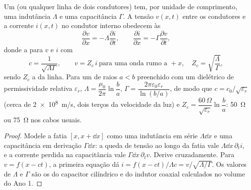 \begin{proposition}\label{prop:b2:dispersion-wave-packets:coax}
Um  (ou qualquer linha de dois condutores) tem, por unidade de comprimento, uma
indutância $\Lambda$ e uma capacitância $\Gamma$. A tensão $v(x, t)$ entre
os condutores e a corrente $i(x, t)$ no condutor interno obedecem às
\emph{}
\[
\frac{\partial v}{\partial x} = -\Lambda\frac{\partial i}{\partial t} , \qquad
\frac{\partial i}{\partial x} = -\Gamma\frac{\partial v}{\partial t} ,
\]
donde a  para $v$ e $i$ com
\[
c = \frac1{\sqrt{\Lambda\Gamma}} , \qquad
v = Z_c\,i \ \text{para uma onda rumo a } +x, \quad Z_c = \sqrt{\frac\Lambda\Gamma} ,
\]
sendo $Z_c$ a \emph{} da linha. Para um
 de raios $a < b$ preenchido com um dielétrico de
permissividade relativa $\varepsilon_r$, $\Lambda = \dfrac{\mu_0}{2\pi}\ln\dfrac ba$, $\Gamma =
\dfrac{2\pi\varepsilon_0\varepsilon_r}{\ln(b/a)}$, de modo que $c = c_0/\sqrt{\varepsilon_r}$ (cerca de
\qty{2e8}{m/s}, dois terços da velocidade da luz) e $Z_c = \dfrac{60\,\Omega}
{\sqrt{\varepsilon_r}}\ln\dfrac ba$: \qty{50}{\ohm} ou \qty{75}{\ohm} nos cabos usuais.
\end{proposition}

\begin{proof}
Modele a fatia $[x, x + \dd x]$ como uma indutância em série $\Lambda\dd x$ e uma
capacitância em derivação $\Gamma\dd x$: a queda de tensão ao longo da fatia vale
$\Lambda\dd x\,\partial_ti$, e a corrente perdida na capacitância vale $\Gamma\dd x
\,\partial_tv$. Derive cruzadamente. Para $v = f(x - ct)$, a primeira equação
dá $i = f(x - ct)/\Lambda c = v/\sqrt{\Lambda/\Gamma}$. Os valores de $\Lambda$ e
$\Gamma$ são os do capacitor cilíndrico e do indutor coaxial
calculados no volume do Ano 1.
\end{proof}

